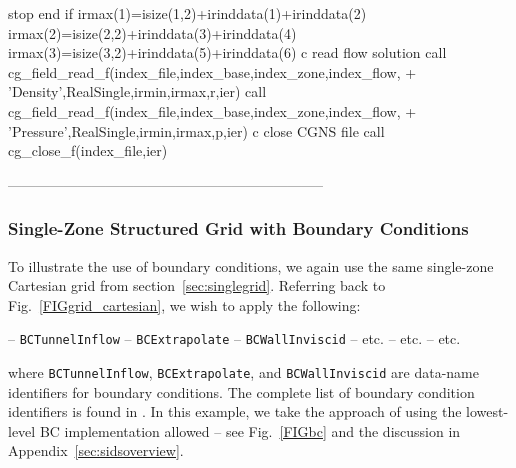 \documentclass[12pt]{article}
\begin{document}
{\newline\indent\indent        stop
\newline\indent      end if
\newline\indent      irmax(1)=isize(1,2)+irinddata(1)+irinddata(2)
\newline\indent      irmax(2)=isize(2,2)+irinddata(3)+irinddata(4)
\newline\indent      irmax(3)=isize(3,2)+irinddata(5)+irinddata(6)
\newline c   read flow solution
\newline\indent      call cg\_field\_read\_f(index\_file,index\_base,index\_zone,index\_flow,
\newline + \indent 'Density',RealSingle,irmin,irmax,r,ier)
\newline\indent      call cg\_field\_read\_f(index\_file,index\_base,index\_zone,index\_flow,
\newline + \indent 'Pressure',RealSingle,irmin,irmax,p,ier)
\newline c  close CGNS file
\newline\indent      call cg\_close\_f(index\_file,ier)}

--------------------------------------------------------------------

\subsubsection{Single-Zone Structured Grid with Boundary Conditions} \label{sec:bcstruct}

To illustrate the use of boundary conditions, we again use the
same single-zone Cartesian grid from section~\ref{sec:singlegrid}.
Referring back to Fig.~\ref{FIGgrid_cartesian}, we wish to apply
the following:

 -- {\tt BCTunnelInflow}
\newline{} -- {\tt BCExtrapolate}
\newline{} -- {\tt BCWallInviscid}
\newline{} -- etc.
\newline{} -- etc.
\newline{} -- etc.

\noindent where {\tt BCTunnelInflow}, {\tt BCExtrapolate}, and
{\tt BCWallInviscid} are data-name identifiers for boundary 
conditions.  The complete list of boundary condition identifiers
is found in \cite{ALLMARAS}.  In this example, we take the approach of 
using the lowest-level BC implementation allowed -- see
Fig.~\ref{FIGbc} and the discussion in Appendix~\ref{sec:sidsoverview}.
\end{document}
